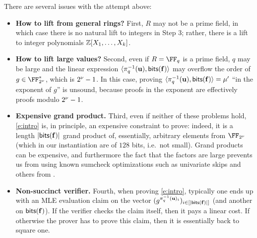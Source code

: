 
\bigskip
     
\noindent There are several issues with the attempt above:
\medskip
\begin{itemize}[leftmargin=*,nosep]
    \item \textbf{How to lift from general rings?} First, $R$ may not be a prime field, in which case there is no natural lift to integers in Step 3; rather, there is a lift to integer polynomials $\mathbb{Z}[X_1, \ldots, X_k]$. 
    \item \textbf{How to lift large values?} Second, even if $R=\FF_q$ is a prime field,  $q$ may be large and the linear expression $\langle \pi_q^{-1}(\mathbf{u}), \mathsf{bits}(\mathbf{f})\rangle$ may overflow the order of $g\in \comfield^{*}$, which is $2^{\nu}-1$. In this case, proving  $\langle \pi_q^{-1}(\mathbf{u}), \mathsf{bits}(\mathbf{f})\rangle = \mu'$  ``in the exponent of $g$'' is unsound, because proofs in the exponent are effectively proofs modulo $2^{\nu}-1$. 
    \item \textbf{Expensive grand product.} Third, even if neither of these problems hold, \eqref{e:intro} is, in principle, an expensive constraint to prove: indeed, it is a length $|\mathsf{bits}(\mathbf{f})|$ grand product of, essentially, arbitrary elements from $\comfield$ (which in our instantiation are of $128$ bits, i.e.\ not small).  Grand products can be expensive, and furthermore the fact that the factors are large prevents us from using known sumcheck optimizations such as univariate skips \cite{gruen} and others from \cite{flock,sumcheck_opt_2}.
    \item \textbf{Non-succinct verifier.} Fourth, when proving \eqref{e:intro}, typically one ends up with an MLE evaluation claim on the vector $(g^{\pi_q^{-1}(\mathbf{u})_i})_{i\in[|\mathsf{bits}(\mathbf{f})|]}$ (and another on $\mathsf{bits}(\mathbf{f})$). If the verifier checks the claim itself, then it pays a linear cost. If otherwise the prover has to prove this claim, then it is essentially back to square one.
\end{itemize}


